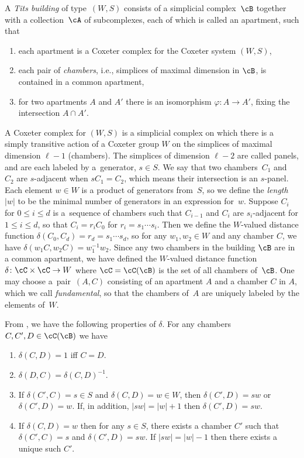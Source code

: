 \begin{Definition} \label{definition:Tits_Building}A {\em Tits building} of type~$(W,S)$ consists of a simplicial complex~$\cB$ together with a collection~$\cA$ of subcomplexes,
each of which is called an apartment, such that
\begin{enumerate}\itemsep=0pt
 \item[1)] each apartment is a Coxeter complex for the Coxeter system $(W,S)$,
 \item[2)] each pair of {\em chambers}, i.e., simplices of maximal dimension in $\cB$, is contained in a common apartment,
 \item[3)] for two apartments $A$ and $A'$ there is an isomorphism $\varphi\colon A\rightarrow A'$, fixing the intersection $A\cap A'$.
\end{enumerate}
\end{Definition}
A Coxeter complex for $(W,S)$ is a simplicial complex on which there is a simply transitive action of a Coxeter group $W$ on
the simplices of maximal dimension $\ell -1$ (chambers). The simplices of dimension $\ell -2$ are called panels, and are
each labeled by a~generator, $s\in S$. We say that two chambers~$C_1$ and~$C_2$ are $s$-adjacent when $sC_1 = C_2$, which
means their intersection is an $s$-panel. Each element $w\in W$ is a product of generators from~$S$, so we define the {\it length}~$|w|$ to be the minimal number of generators in an expression for~$w$.
Suppose $C_i$ for $0\leq i\leq d$ is a~sequence of chambers such that $C_{i-1}$ and $C_i$ are
$s_i$-adjacent for $1\leq i\leq d$, so that $C_i = r_i C_0$ for $r_i = s_1\cdots s_i$. Then we define the $W$-valued distance function $\delta(C_0,C_d) = r_d = s_1\cdots s_d$, so for any $w_1,w_2\in W$ and any chamber $C$, we have $\delta(w_1 C,w_2 C) = w_1^{-1} w_2$. Since any two chambers in the building $\cB$ are in a common apartment, we have defined the $W$-valued distance function $\delta\colon \cC\times\cC\to W$ where $\cC = \cC(\cB)$ is the set of all chambers of~$\cB$.
One may choose a~pair~$(A,C)$ consisting of an apartment $A$ and a chamber $C$ in $A$, which we call {\it fundamental}, so that the chambers of~$A$ are uniquely labeled by the elements of~$W$.

From \cite[Proposition 4.84]{AbramenkoBrown08}, we have the following properties of $\delta$. For any chambers $C,C',D\in \cC(\cB)$ we have
\begin{enumerate}\itemsep=0pt
 \item $\delta(C,D) = 1$ iff $C = D$.
 \item $\delta(D,C) = \delta(C,D)^{-1}$.
 \item If $\delta(C',C) = s\in S$ and $\delta(C,D) = w\in W$, then $\delta(C',D) = sw$ or $\delta(C',D) = w$. If, in addition,
 $|sw| = |w| + 1$ then $\delta(C',D) = sw$.
 \item If $\delta(C,D) = w$ then for any $s\in S$, there exists a chamber $C'$ such that $\delta(C',C) = s$ and $\delta(C',D) = sw$.
 If $|sw| = |w| -1$ then there exists a unique such $C'$.
\end{enumerate}

